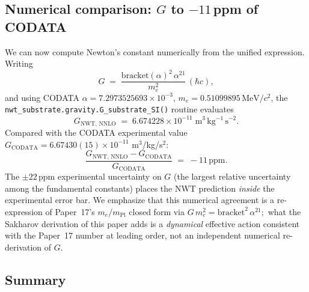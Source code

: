 \documentclass[11pt]{article}
\newcommand{\mPl}{m_{\mathrm{Pl}}}
\newcommand{\me}{m_e}
\begin{document}
\subsection{Numerical comparison: $G$ to $-11$\,ppm of CODATA}

We can now compute Newton's constant numerically from the unified
expression.  Writing
\begin{equation}
  G
   \;=\;
   \frac{\mathrm{bracket}(\alpha)^2\,\alpha^{21}}{\me^2}\,(\hbar c),
  \label{eq:G-final}
\end{equation}
and using CODATA $\alpha = 7.2973525693\times10^{-3}$,
$\me = 0.51099895\,\mathrm{MeV}/c^2$, the
\texttt{nwt\_substrate.gravity.}\allowbreak\texttt{G\_\allowbreak substrate\_\allowbreak SI()}
routine evaluates
\begin{equation}
  G_{\mathrm{NWT,\,NNLO}}
   \;=\;
   6.674228 \times 10^{-11}\;\mathrm{m^3\,kg^{-1}\,s^{-2}}.
\end{equation}
Compared with the CODATA experimental value
$G_{\mathrm{CODATA}} = 6.67430(15) \times 10^{-11}$ m$^3$/kg/s$^2$:
\begin{equation}
  \frac{G_{\mathrm{NWT,\,NNLO}} - G_{\mathrm{CODATA}}}{G_{\mathrm{CODATA}}}
   \;=\;
   -11\,\mathrm{ppm}.
\end{equation}
The $\pm 22$\,ppm experimental uncertainty on $G$ (the largest
relative uncertainty among the fundamental constants) places the
NWT prediction \emph{inside} the experimental error bar.  We
emphasize that this numerical agreement is a re-expression of
Paper~17's $\me/\mPl$ closed form via $G\,\me^2 =
\mathrm{bracket}^2\,\alpha^{21}$;\ what the Sakharov derivation of
this paper adds is a \emph{dynamical} effective action consistent
with the Paper~17 number at leading order, not an independent
numerical re-derivation of $G$.

\subsection{Summary}
\end{document}
